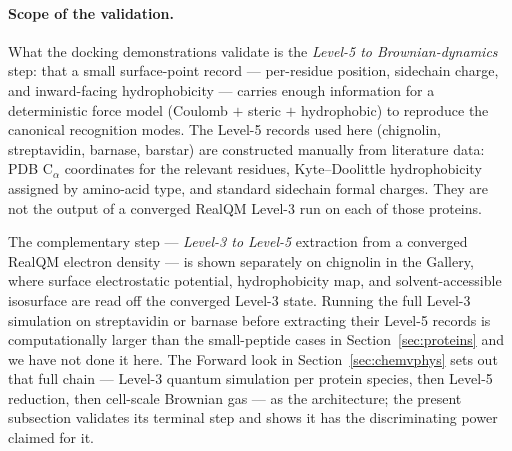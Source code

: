 \documentclass[11pt]{article}
\begin{document}
\paragraph{Scope of the validation.}
What the docking demonstrations validate is the \emph{Level-5 to Brownian-dynamics} step: that a small surface-point record --- per-residue position, sidechain charge, and inward-facing hydrophobicity --- carries enough information for a deterministic force model (Coulomb $+$ steric $+$ hydrophobic) to reproduce the canonical recognition modes. The Level-5 records used here (chignolin, streptavidin, barnase, barstar) are constructed manually from literature data: PDB C$_\alpha$ coordinates for the relevant residues, Kyte--Doolittle hydrophobicity assigned by amino-acid type, and standard sidechain formal charges. They are not the output of a converged RealQM Level-3 run on each of those proteins.

The complementary step --- \emph{Level-3 to Level-5} extraction from a converged RealQM electron density --- is shown separately on chignolin in the Gallery, where surface electrostatic potential, hydrophobicity map, and solvent-accessible isosurface are read off the converged Level-3 state. Running the full Level-3 simulation on streptavidin or barnase before extracting their Level-5 records is computationally larger than the small-peptide cases in Section~\ref{sec:proteins} and we have not done it here. The Forward look in Section~\ref{sec:chemvphys} sets out that full chain --- Level-3 quantum simulation per protein species, then Level-5 reduction, then cell-scale Brownian gas --- as the architecture; the present subsection validates its terminal step and shows it has the discriminating power claimed for it.
\end{document}
